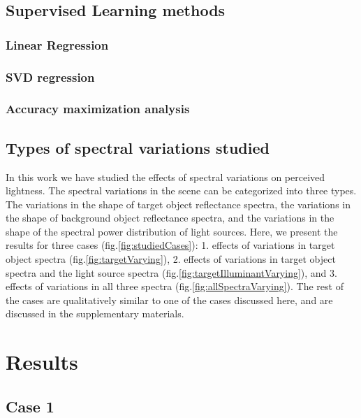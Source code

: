 \documentclass{jov}
\begin{document}
\subsection{Supervised Learning methods} \label{method:SupervisedLearning}
\subsubsection*{Linear Regression}
\subsubsection*{SVD regression}
\subsubsection*{Accuracy maximization analysis}

\subsection{Types of spectral variations studied}
In this work we have studied the effects of spectral variations on perceived lightness. The spectral variations in the scene can be categorized into three types. The variations in the shape of target object reflectance spectra, the variations in the shape of background object reflectance spectra, and the variations in the shape of the spectral power distribution of light sources. Here, we present the results for three cases (fig.\ref{fig:studiedCases}): 1. effects of variations in target object spectra (fig.\ref{fig:targetVarying}), 2. effects of variations in target object spectra and the light source spectra (fig.\ref{fig:targetIlluminantVarying}), and 3. effects of variations in all three spectra (fig.\ref{fig:allSpectraVarying}). The rest of the cases are qualitatively similar to one of the cases discussed here, and are discussed in the supplementary materials. 


\section{Results}
\subsection{Case 1}
\end{document}
